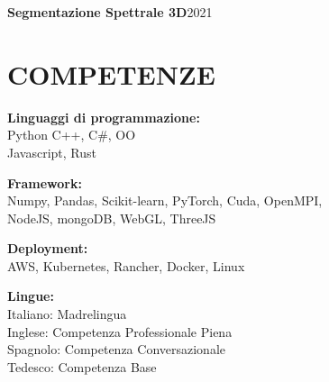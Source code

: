         \resumeProjectHeading
          {\textbf{Segmentazione Spettrale 3D}}{2021}
          \resumeItemListStart

          \resumeItemListEnd
    \resumeSubHeadingListEnd


%
\section{COMPETENZE}

\begin{minipage}[ht]{0.48\textwidth}
\textbf{Linguaggi di programmazione:} \\
Python C++, C\#, OO \\ Javascript, Rust
\vspace{1em}

\textbf{Framework:} \\
Numpy, Pandas, Scikit-learn, PyTorch, Cuda, OpenMPI, \\ 
NodeJS, mongoDB, WebGL, ThreeJS
\end{minipage}
\begin{minipage}[ht]{0.48\textwidth}
\textbf{Deployment:} \\
AWS, Kubernetes, Rancher, Docker, Linux

\vspace{1em}
\textbf{Lingue:} \\
Italiano: Madrelingua \\
Inglese: Competenza Professionale Piena\\
Spagnolo: Competenza Conversazionale \\
Tedesco: Competenza Base

\end{minipage}




